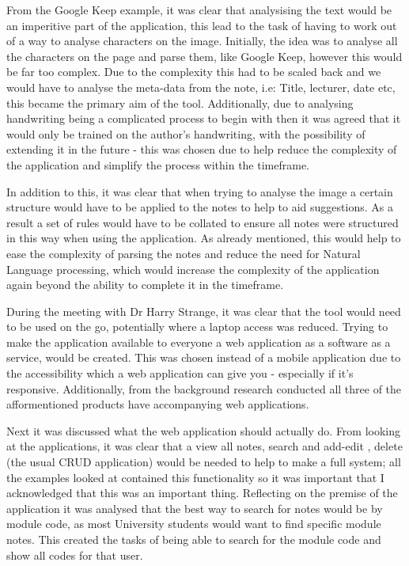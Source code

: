 From the Google Keep example, it was clear that analysising the text would be an imperitive part of the application, this lead to the task of having to work out of a way to analyse characters on the image. Initially, the idea was to analyse all the characters on the page and parse them, like Google Keep, however this would be far too complex. Due to the complexity this had to be scaled back and we would have to analyse the meta-data from the note, i.e: Title, lecturer, date etc, this became the primary aim of the tool. Additionally, due to analysing handwriting being a complicated process to begin with then it was agreed that it would only be trained on the author's handwriting,  with the possibility of extending it in the future - this was chosen due to help reduce the complexity of the application and simplify the process within the timeframe.

In addition to this, it was clear that when trying to analyse the image a certain structure would have to be applied to the notes to help to aid suggestions. As a result a set of rules would have to be collated to ensure all notes were structured in this way when using the application. As already mentioned, this would help to ease the complexity of parsing the notes and reduce the need for Natural Language processing, which would increase the complexity of the application again beyond the ability to complete it in the timeframe. 

During the meeting with Dr Harry Strange, it was clear that the tool would need to be used on the go, potentially where a laptop access was reduced. Trying to make the application available to everyone a web application as a software as a service, would be created. This was chosen instead of a mobile application due to the accessibility which a web application can give you - especially if it's responsive. Additionally, from the background research conducted all three of the afformentioned products have accompanying web applications.

Next it was discussed what the web application should actually do. From looking at the applications, it was clear that a view all notes, search and add-edit , delete (the usual CRUD application) would be needed to help to make a full system; all the examples looked at contained this functionality so it was important that I acknowledged that this was an important thing. Reflecting on the premise of the application it was analysed that the best way to search for notes would be by module code, as most University students would want to find specific module notes. This created the tasks of being able to search for the module code and show all codes for that user. 

